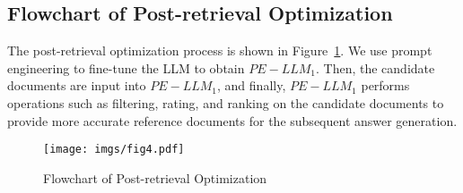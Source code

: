 



\subsection{Flowchart of Post-retrieval Optimization}


The post-retrieval optimization process is shown in Figure~\ref{fig:fig4}. We use prompt engineering to fine-tune the LLM to obtain $PE-LLM_1$. Then, the candidate documents are input into $PE-LLM_1$, and finally, $PE-LLM_1$ performs operations such as filtering, rating, and ranking on the candidate documents to provide more accurate reference documents for the subsequent answer generation.

\begin{figure}[h!]
    \centering
    \texttt{[image: imgs/fig4.pdf]}
    \vspace{-5pt}
    \caption{ Flowchart of Post-retrieval Optimization}
    \label{fig:fig4}
\end{figure}

